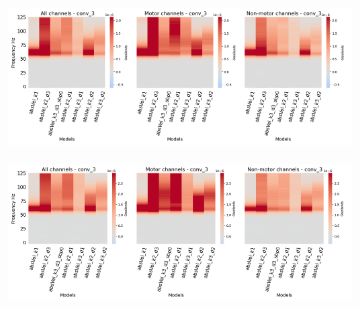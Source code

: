 \begin{figure}[!hpbp]
\begin{subfigure}[a]{\textwidth}
   \includegraphics[width=1\linewidth]{img/ch4/absVel-conv-3-layer-grads-hp}
   \caption{}
\end{subfigure}\label{fig:absVel-conv-3-layer-grads-hp}

\begin{subfigure}[b]{\textwidth}
   \includegraphics[width=1\linewidth]{img/ch4/absVel-conv-3-layer-grads-hp-shifted}
   \caption{}
\end{subfigure}\label{fig:absVel-conv-3-layer-grads-shifted-hp}
\caption[]{}
\end{figure}\label{fig:absVel-shifted-vs-non-shifted-grads-hp}

